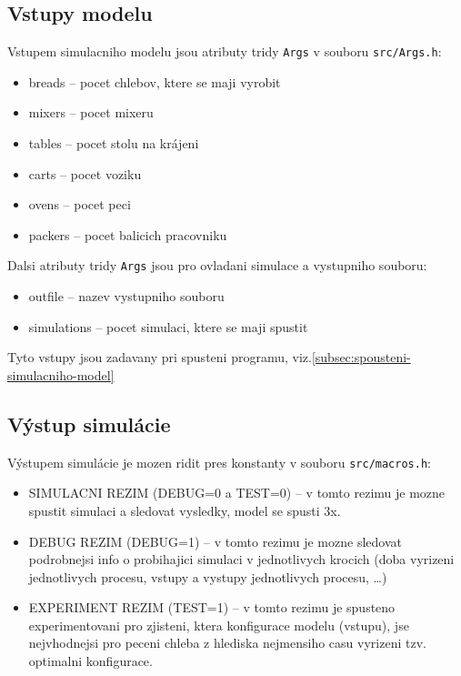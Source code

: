 \documentclass[a4paper, 10pt]{article}
\begin{document}
    \subsection{Vstupy modelu}
    Vstupem simulacniho modelu jsou atributy tridy \texttt{Args} v souboru \texttt{src/Args.h}:
    \begin{itemize}
        \item breads -- pocet chlebov, ktere se maji vyrobit
        \item mixers -- pocet mixeru
        \item tables -- pocet stolu na krájeni
        \item carts -- pocet voziku
        \item ovens -- pocet peci
        \item packers -- pocet balicich pracovniku
    \end{itemize}

    Dalsi atributy tridy \texttt{Args} jsou pro ovladani simulace a vystupniho souboru:
    \begin{itemize}
        \item outfile -- nazev vystupniho souboru
        \item simulations -- pocet simulaci, ktere se maji spustit
    \end{itemize}

    Tyto vstupy jsou zadavany pri spusteni programu, viz.\ref{subsec:spousteni-simulacniho-model}

    \subsection{Výstup simulácie}
    Výstupem simulácie je mozen ridit pres konstanty v souboru \texttt{src/macros.h}:
    \begin{itemize}
        \item SIMULACNI REZIM (DEBUG=0 a TEST=0) -- v tomto rezimu je mozne spustit simulaci a sledovat vysledky, model se spusti 3x.
        \item DEBUG REZIM (DEBUG=1) -- v tomto rezimu je mozne sledovat podrobnejsi info o probihajici simulaci
        v jednotlivych krocich (doba vyrizeni jednotlivych procesu, vstupy a vystupy jednotlivych procesu, \ldots)
        \item EXPERIMENT REZIM (TEST=1) -- v tomto rezimu je spusteno experimentovani pro zjisteni,
        ktera konfigurace modelu (vstupu), jse nejvhodnejsi pro peceni
        chleba z hlediska nejmensiho casu vyrizeni tzv. optimalni konfigurace.
    \end{itemize}
\end{document}
